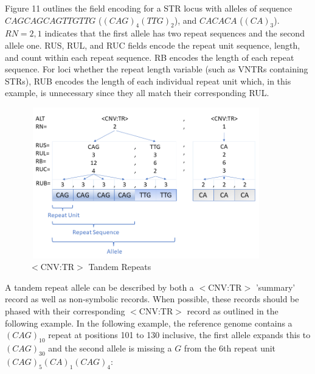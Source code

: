 \documentclass[8pt]{article}
\begin{document}
Figure 11 outlines the field encoding for a STR locus with alleles of sequence $CAGCAGCAGTTGTTG$ ($(CAG)_{4}(TTG)_{2}$), and $CACACA$ ($(CA)_{3}$).
$RN=2,1$ indicates that the first allele has two repeat sequences and the second allele one.
RUS, RUL, and RUC fields encode the repeat unit sequence, length, and count within each repeat sequence.
RB encodes the length of each repeat sequence.
For loci whether the repeat length variable (such as VNTRs containing STRs), RUB encodes the length of each individual repeat unit which, in this example, is unnecessary since they all match their corresponding RUL.

\begin{figure}[ht]
	\centering
	\includegraphics[width=4in,height=2.58in]{img/tandem_repeat_notation.png}
	\caption{$<$CNV:TR$>$ Tandem Repeats}
\end{figure}


A tandem repeat allele can be described by both a $<$CNV:TR$>$ 'summary' record as well as non-symbolic records.
When possible, these records should be phased with their corresponding $<$CNV:TR$>$ record as outlined in the following example.
In the following example, the reference genome contains a $(CAG)_{10}$ repeat at positions 101 to 130 inclusive, the first allele expands this to $(CAG)_{30}$ and the second allele is missing a $G$ from the 6th repeat unit $(CAG)_{5}(CA)_{1}(CAG)_{4}$:
\end{document}
